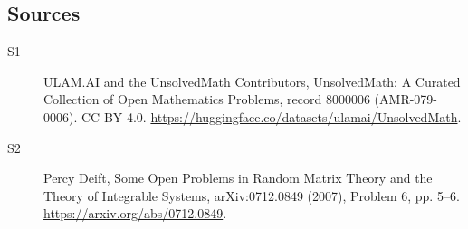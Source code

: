 \documentclass[11pt]{article}
\begin{document}
\subsection{Sources}
\begin{description}
\item[\hypertarget{source:8000006:1}{S1}] ULAM.AI and the UnsolvedMath Contributors, UnsolvedMath: A Curated Collection of Open Mathematics Problems, record 8000006 (AMR-079-0006). CC BY 4.0. \url{https://huggingface.co/datasets/ulamai/UnsolvedMath}.
\item[\hypertarget{source:8000006:2}{S2}] Percy Deift, Some Open Problems in Random Matrix Theory and the Theory of Integrable Systems, arXiv:0712.0849 (2007), Problem 6, pp. 5--6. \url{https://arxiv.org/abs/0712.0849}.
\end{description}
\label{end:8000006}
\end{document}
